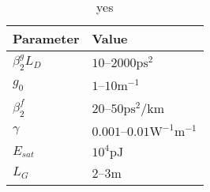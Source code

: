 \documentclass[12pt]{article}
\newcommand{\Es}{E_{sat}}
\begin{document}
\begin{table}
\begin{tabular}{|l|l|}
\hline
Parameter & Value \\
\hline
$\beta_2^g L_D$ & $10$--$2000 \text{ps}^2$ \\
$g_0$ & $1$--$10 \text{m}^{-1}$ \\
$\beta_2^f$ & $20$--$50 \text{ps}^2/ \text{km}$ \\
$\gamma$ & $0.001$--$0.01 \text{W}^{-1} \text{m}^{-1}$ \cite{agrawal2013} \\
$\Es$ & $10^4 \text{pJ}$ \\
$L_G$ & $2$--$3 \text{m}$ \cite{burgoyne2014, shtyrina, yarutkina} \\
\hline
\end{tabular}
\caption{yes}
\end{table}


\newpage
\printbibliography
\end{document}
